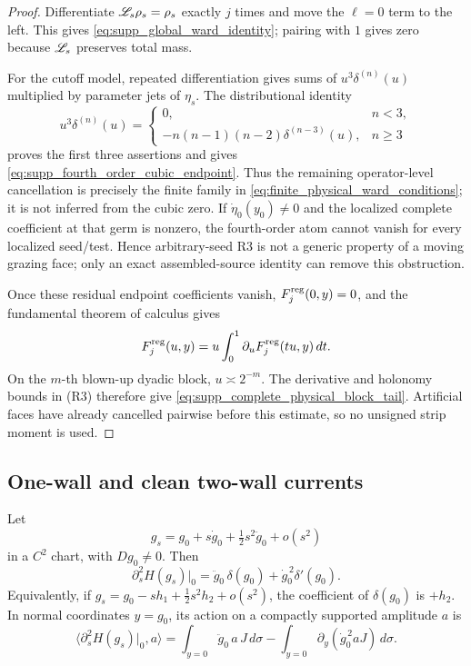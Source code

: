 \begin{proof}
Differentiate
\(\mathscr L_s\rho_s=\rho_s\) exactly \(j\) times and move the
\(\ell=0\) term to the left.  This gives
\eqref{eq:supp_global_ward_identity}; pairing with \(1\) gives zero because
\(\mathscr L_s\) preserves total mass.

For the cutoff model, repeated differentiation gives sums of
\(u^3\delta^{(n)}(u)\) multiplied by parameter jets of \(\eta_s\).  The
distributional identity
\[
  u^3\delta^{(n)}(u)
  =
  \begin{cases}
    0,&n<3,\\
    -n(n-1)(n-2)\delta^{(n-3)}(u),&n\ge3
  \end{cases}
\]
proves the first three assertions and gives
\eqref{eq:supp_fourth_order_cubic_endpoint}.  Thus the remaining
operator-level cancellation is precisely the finite family in
\eqref{eq:finite_physical_ward_conditions}; it is not inferred from the
cubic zero.  If \(\dot\eta_0(y_0)\ne0\) and the localized complete coefficient
at that germ is nonzero, the fourth-order atom cannot vanish for every
localized seed/test.  Hence arbitrary-seed R3 is not a generic property of a
moving grazing face; only an exact assembled-source identity can remove this
obstruction.

Once these residual endpoint coefficients vanish,
\(F_j^{\rm reg}(0,y)=0\), and the fundamental theorem of calculus gives
\[
  F_j^{\rm reg}(u,y)
  =
  u\int_0^1\partial_uF_j^{\rm reg}(tu,y)\,dt .
\]
On the \(m\)-th blown-up dyadic block, \(u\asymp2^{-m}\).  The derivative and
holonomy bounds in (R3) therefore give
\eqref{eq:supp_complete_physical_block_tail}.  Artificial faces have already
cancelled pairwise before this estimate, so no unsigned strip moment is used.
\end{proof}

\subsection{One-wall and clean two-wall currents}

\begin{lemma}
\label{lem:supp_second_order_single_wall_trace}
Let
\[
  g_s=g_0+s\dot g_0+\tfrac12s^2\ddot g_0+o(s^2)
\]
in a \(C^2\) chart, with \(Dg_0\ne0\).  Then
\begin{equation}
\label{eq:supp_second_heaviside_derivative}
  \partial_s^2H(g_s)|_0
  =
  \ddot g_0\,\delta(g_0)
  +\dot g_0^{\,2}\delta'(g_0).
\end{equation}
Equivalently, if
\(g_s=g_0-sh_1+\frac12s^2h_2+o(s^2)\), the coefficient of
\(\delta(g_0)\) is \(+h_2\).  In normal coordinates \(y=g_0\), its action on
a compactly supported amplitude \(a\) is
\[
  \langle\partial_s^2H(g_s)|_0,a\rangle
  =
  \int_{y=0}\ddot g_0\,a\,J\,d\sigma
  -
  \int_{y=0}\partial_y(\dot g_0^{\,2}aJ)\,d\sigma .
\]
\end{lemma}

